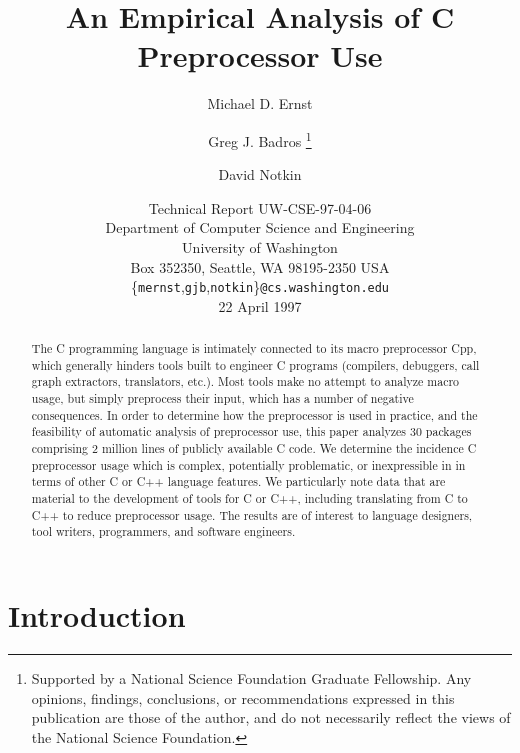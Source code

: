 \documentclass[11pt]{article}
\def\numpackages{30}
\def\numlines{2 million}
\begin{document}
% 


\title{An Empirical Analysis of C Preprocessor Use}

\author{Michael D. Ernst%
  \and Greg J. Badros%
  \thanks{Supported by a National Science Foundation
    Graduate Fellowship. Any opinions, findings, conclusions, or
    recommendations expressed in this publication are those of the
    author, and do not necessarily reflect the views of the National
    Science Foundation.}
  \and David Notkin}

\date{Technical Report UW-CSE-97-04-06 \\
Department of Computer Science and Engineering \\
University of Washington \\
Box 352350, Seattle, WA  98195-2350  USA \\
{\small \{{\tt mernst},{\tt gjb},{\tt notkin}\}{\tt @cs.washington.edu}} \\
22 April 1997}  

\maketitle

\begin{abstract}
  The C programming language is intimately connected to its macro
  preprocessor Cpp, which generally hinders tools built to engineer C
  programs (compilers, debuggers, call graph extractors, translators,
  etc.).  Most tools make no attempt to analyze macro usage, but simply
  preprocess their input, which has a number of negative consequences.  In
  order to determine how the preprocessor is used in practice, and the
  feasibility of automatic analysis of preprocessor use, this paper
  analyzes {\numpackages} packages comprising {\numlines} lines of publicly
  available C code.  We determine the incidence C preprocessor usage which
  is complex, potentially problematic, or inexpressible in in terms of
  other C or C++ language features.  We particularly note data that are
  material to the development of tools for C or C++, including translating
  from C to C++ to reduce preprocessor usage.  The results are of interest
  to language designers, tool writers, programmers, and software engineers.
\end{abstract}

\bigskip

\section{Introduction}
\end{document}
